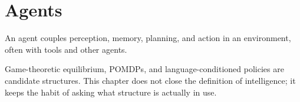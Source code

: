 \chapter{Agents}
\label{ch:agents}

An agent couples perception, memory, planning, and action in an environment, often with tools and other agents.

Game-theoretic equilibrium, POMDPs, and language-conditioned policies are candidate structures. This chapter does not close the definition of intelligence; it keeps the habit of asking what structure is actually in use.
